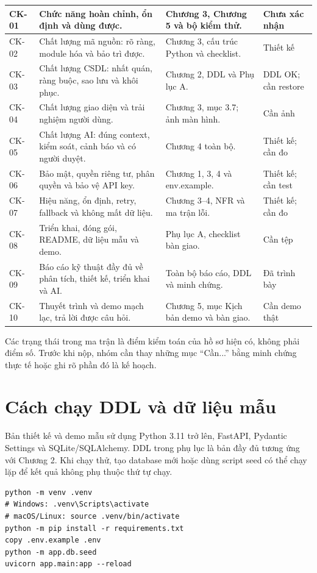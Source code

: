 \begin{longtable}{|C{1.0cm}|L{5.0cm}|L{4.7cm}|L{2.3cm}|}
CK-01 & Chức năng hoàn chỉnh, ổn định và dùng được. & Chương 3, Chương 5 và bộ kiểm thử. & Chưa xác nhận\\\hline
CK-02 & Chất lượng mã nguồn: rõ ràng, module hóa và bảo trì được. & Chương 3, cấu trúc Python và checklist. & Thiết kế\\\hline
CK-03 & Chất lượng CSDL: nhất quán, ràng buộc, sao lưu và khôi phục. & Chương 2, DDL và Phụ lục A. & DDL OK; cần restore\\\hline
CK-04 & Chất lượng giao diện và trải nghiệm người dùng. & Chương 3, mục 3.7; ảnh màn hình. & Cần ảnh\\\hline
CK-05 & Chất lượng AI: đúng context, kiểm soát, cảnh báo và có người duyệt. & Chương 4 toàn bộ. & Thiết kế; cần đo\\\hline
CK-06 & Bảo mật, quyền riêng tư, phân quyền và bảo vệ API key. & Chương 1, 3, 4 và env.example. & Thiết kế; cần test\\\hline
CK-07 & Hiệu năng, ổn định, retry, fallback và không mất dữ liệu. & Chương 3--4, NFR và ma trận lỗi. & Thiết kế; cần đo\\\hline
CK-08 & Triển khai, đóng gói, README, dữ liệu mẫu và demo. & Phụ lục A, checklist bàn giao. & Cần tệp\\\hline
CK-09 & Báo cáo kỹ thuật đầy đủ về phân tích, thiết kế, triển khai và AI. & Toàn bộ báo cáo, DDL và minh chứng. & Đã trình bày\\\hline
CK-10 & Thuyết trình và demo mạch lạc, trả lời được câu hỏi. & Chương 5, mục Kịch bản demo và bàn giao. & Cần demo thật\\\hline
\end{longtable}
\endgroup

\noindent Các trạng thái trong ma trận là điểm kiểm toán của hồ sơ hiện có, không phải điểm số. Trước khi nộp, nhóm cần thay những mục ``Cần...'' bằng minh chứng thực tế hoặc ghi rõ phần đó là kế hoạch.

\section{Cách chạy DDL và dữ liệu mẫu}

Bản thiết kế và demo mẫu sử dụng Python 3.11 trở lên, FastAPI, Pydantic Settings và SQLite/SQLAlchemy. DDL trong phụ lục là bản đầy đủ tương ứng với Chương 2. Khi chạy thử, tạo database mới hoặc dùng script seed có thể chạy lặp để kết quả không phụ thuộc thứ tự chạy.

\begin{lstlisting}[language={},caption={Các lệnh chạy thử}]
python -m venv .venv
# Windows: .venv\Scripts\activate
# macOS/Linux: source .venv/bin/activate
python -m pip install -r requirements.txt
copy .env.example .env
python -m app.db.seed
uvicorn app.main:app --reload
\end{lstlisting}

